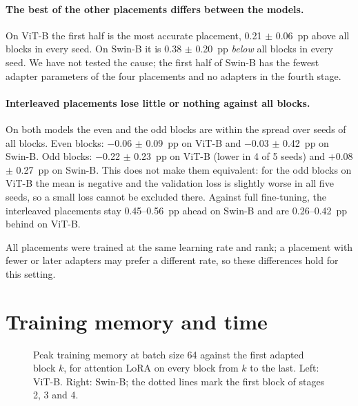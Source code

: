 \paragraph{The best of the other placements differs between the models.} On ViT-B the first half is the most
accurate placement, 0.21 $\pm$ 0.06~pp above all blocks in every seed. On Swin-B it is 0.38 $\pm$ 0.20~pp
\emph{below} all blocks in every seed. We have not tested the cause; the first
half of Swin-B has the fewest adapter parameters of the four placements and no adapters in the fourth stage.

\paragraph{Interleaved placements lose little or nothing against all blocks.} On both models the even and the odd
blocks are within the spread over seeds of all blocks. Even blocks: $-$0.06 $\pm$ 0.09~pp on ViT-B and $-$0.03 $\pm$
0.42~pp on Swin-B. Odd blocks: $-$0.22 $\pm$ 0.23~pp on ViT-B (lower in 4 of 5 seeds) and $+$0.08 $\pm$ 0.27~pp on
Swin-B. This does not make them equivalent: for the odd blocks on ViT-B the mean is negative
and the validation loss is slightly worse in all five seeds, so a small loss cannot be excluded there. Against full
fine-tuning, the interleaved placements stay 0.45--0.56~pp ahead on Swin-B and are 0.26--0.42~pp behind on ViT-B.

All placements were trained at the same learning rate and rank; a placement with fewer or later adapters may prefer
a different rate, so these differences hold for this setting.

\section{Training memory and time}

\begin{figure}[!htb]
\centering
{\renewcommand{\figH}{0.27\textwidth}}
\caption{Peak training memory at batch size 64 against the first adapted block $k$, for attention LoRA on every
block from $k$ to the last. Left: ViT-B. Right: Swin-B; the dotted lines mark the first block of stages 2, 3 and 4.}
\label{fig:mem_start}
\end{figure}


